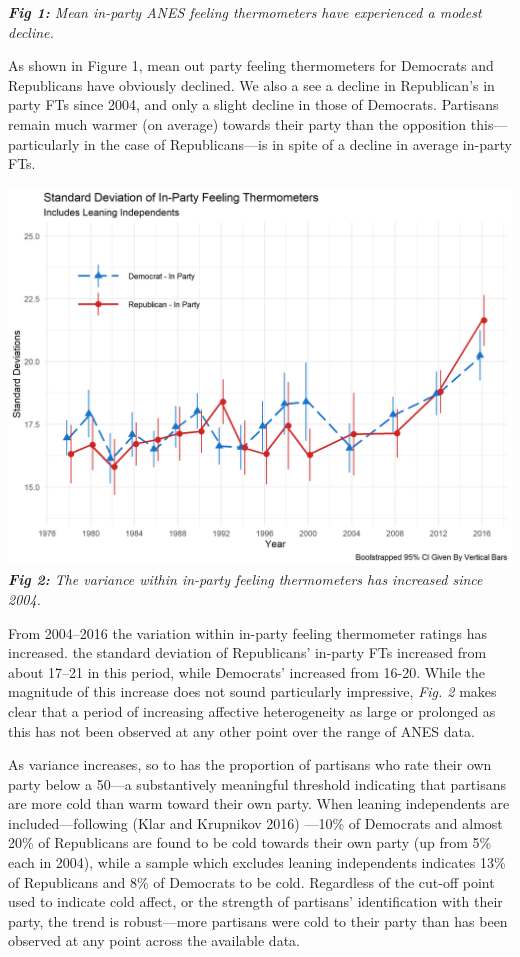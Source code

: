 \documentclass[
  12,
]{paper}
\begin{document}
\emph{\textbf{Fig 1:} Mean in-party ANES feeling thermometers have
experienced a modest decline.}

As shown in Figure 1, mean out party feeling thermometers for Democrats
and Republicans have obviously declined. We also a see a decline in
Republican's in party FTs since 2004, and only a slight decline in those
of Democrats. Partisans remain much warmer (on average) towards their
party than the opposition this---particularly in the case of
Republicans---is in spite of a decline in average in-party FTs.

\includegraphics{fig/gg-sd-ns.png} \emph{\textbf{Fig 2:} The variance
within in-party feeling thermometers has increased since 2004.}

From 2004--2016 the variation within in-party feeling thermometer
ratings has increased. the standard deviation of Republicans' in-party
FTs increased from about 17--21 in this period, while Democrats'
increased from 16-20. While the magnitude of this increase does not
sound particularly impressive, \emph{Fig. 2} makes clear that a period
of increasing affective heterogeneity as large or prolonged as this has
not been observed at any other point over the range of ANES data.

As variance increases, so to has the proportion of partisans who rate
their own party below a 50---a substantively meaningful threshold
indicating that partisans are more cold than warm toward their own
party. When leaning independents are included---following (Klar and
Krupnikov 2016) ---10\% of Democrats and almost 20\% of Republicans are
found to be cold towards their own party (up from 5\% each in 2004),
while a sample which excludes leaning independents indicates 13\% of
Republicans and 8\% of Democrats to be cold. Regardless of the cut-off
point used to indicate cold affect, or the strength of partisans'
identification with their party, the trend is robust---more partisans
were cold to their party than has been observed at any point across the
available data.
\end{document}
